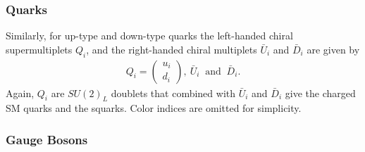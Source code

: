 \documentclass[twoside,english]{uiofysmaster}
\begin{document}
\subsubsection{Quarks}

Similarly, for up-type and down-type quarks the left-handed chiral supermultiplets $Q_i$,  and the right-handed chiral multiplets $\bar{U}_i$ and $\bar{D}_i$ are given by
\begin{align}
Q_i = \begin{pmatrix}
u_i\\
d_i
\end{pmatrix},
~ \bar{U}_i ~ \text{ and }~ \bar{D}_i.
\end{align}
Again, $Q_i$ are $SU(2)_L$ doublets that combined with $\bar{U}_i$ and $\bar{D}_i$ give the charged SM quarks and the squarks. Color indices are omitted for simplicity.

\subsubsection{Gauge Bosons}
\end{document}
